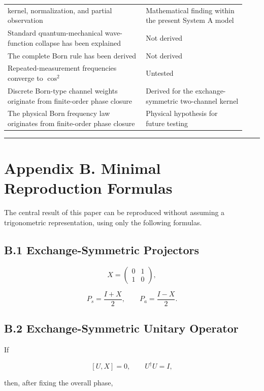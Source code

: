 \documentclass[
  a4paper,
  10pt]{article}
\begin{document}
{\begin{longtable}[]{@{}p{0.54\linewidth}p{0.39\linewidth}@{}}
kernel, normalization, and partial observation & Mathematical finding
within the present System A model \\
Standard quantum-mechanical wave-function collapse has been explained &
Not derived \\
The complete Born rule has been derived & Not derived \\
Repeated-measurement frequencies converge to \(\cos^2\) & Untested \\
Discrete Born-type channel weights originate from finite-order phase
closure & Derived for the exchange-symmetric two-channel kernel \\
The physical Born frequency law originates from finite-order phase
closure & Physical hypothesis for future testing \\
\end{longtable}
}

\begin{center}\rule{0.5\linewidth}{0.5pt}\end{center}

\section{Appendix B. Minimal Reproduction
Formulas}\label{appendix-b-minimal-reproduction-formulas}

The central result of this paper can be reproduced without assuming a
trigonometric representation, using only the following formulas.

\subsection{B.1 Exchange-Symmetric
Projectors}\label{b1-exchange-symmetric-projectors}

\[
X=
\begin{pmatrix}
0&1\\
1&0
\end{pmatrix},
\]

\[
P_s=\frac{I+X}{2},
\qquad
P_a=\frac{I-X}{2}.
\]

\subsection{B.2 Exchange-Symmetric Unitary
Operator}\label{b2-exchange-symmetric-unitary-operator}

If

\[
[U,X]=0,
\qquad
U^\dagger U=I,
\]

then, after fixing the overall phase,
\end{document}
